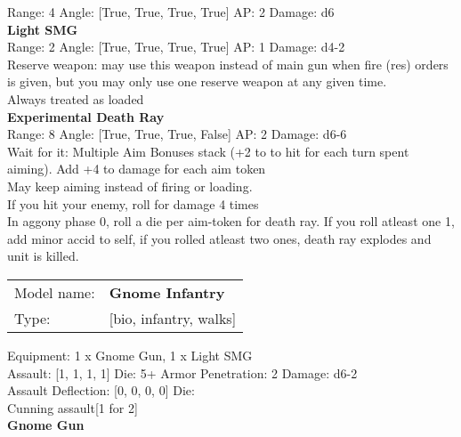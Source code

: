 Range: 4  Angle: [True, True, True, True] AP: 2 Damage: d6 \\




{\bf Light SMG } \\



Range: 2  Angle: [True, True, True, True] AP: 1 Damage: d4-2 \\
Reserve weapon: may use this weapon instead of main gun when fire (res) orders is given, but you may only use one reserve weapon at any given time.\\ 
Always treated as loaded\\ 




{\bf Experimental Death Ray } \\



Range: 8  Angle: [True, True, True, False] AP: 2 Damage: d6-6 \\
Wait for it: Multiple Aim Bonuses stack (+2 to to hit for each turn spent aiming). Add +4 to damage for each aim token\\ 
May keep aiming instead of firing or loading.\\ 
If you hit your enemy, roll for damage 4 times\\ 
In aggony phase 0, roll a die per aim-token for death ray. If you roll atleast one 1, add minor accid to self, if you rolled atleast two ones, death ray explodes and unit is killed.\\ 




 



\begin{tabular}{ll}
Model name: & {\bf Gnome Infantry } \\
Type: & [bio, infantry, walks] \\
\end{tabular}

Equipment: 1 x Gnome Gun, 1 x Light SMG \\

Assault: [1, 1, 1, 1] Die: 5+ Armor Penetration: 2 Damage: d6-2 \\
Assault Deflection: [0, 0, 0, 0] Die: \\
\indent Cunning assault[1 for 2]\\ 
 



{\bf Gnome Gun } \\



